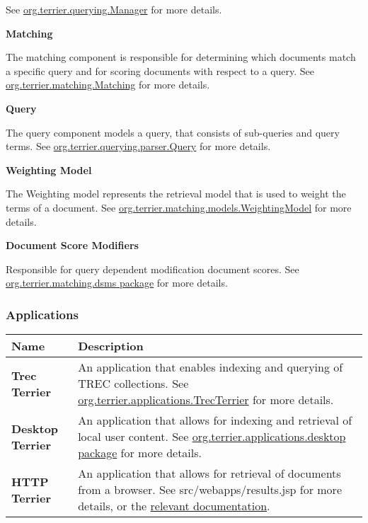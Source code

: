 See
\href{javadoc/org/terrier/querying/Manager.html}{org.terrier.querying.Manager}
for more details.

\textbf{Matching}

The matching component is responsible for determining which documents
match a specific query and for scoring documents with respect to a
query. See
\href{javadoc/org/terrier/matching/Matching.html}{org.terrier.matching.Matching}
for more details.

\textbf{Query}

The query component models a query, that consists of sub-queries and
query terms. See
\href{javadoc/org/terrier/querying/parser/Query.html}{org.terrier.querying.parser.Query}
for more details.

\textbf{Weighting Model}

The Weighting model represents the retrieval model that is used to
weight the terms of a document. See
\href{javadoc/org/terrier/matching/models/WeightingModel.html}{org.terrier.matching.models.WeightingModel}
for more details.

\textbf{Document Score Modifiers}

Responsible for query dependent modification document scores. See
\href{javadoc/org/terrier/matching/dsms/package-summary.html}{org.terrier.matching.dsms
package} for more details.

\subsubsection{Applications}\label{applications}

\begin{longtable}[]{@{}ll@{}}
\toprule
\textbf{Name} & \textbf{Description}\tabularnewline
\midrule
\endhead
\textbf{Trec Terrier} & An application that enables indexing and
querying of TREC collections. See
\href{javadoc/org/terrier/applications/TrecTerrier.html}{org.terrier.applications.TrecTerrier}
for more details.\tabularnewline
\textbf{Desktop Terrier} & An application that allows for indexing and
retrieval of local user content. See
\href{javadoc/org/terrier/applications/desktop/package-summary.html}{org.terrier.applications.desktop
package} for more details.\tabularnewline
\textbf{HTTP Terrier} & An application that allows for retrieval of
documents from a browser. See src/webapps/results.jsp for more details,
or the \href{terrier_http.html}{relevant documentation}.\tabularnewline
\bottomrule
\end{longtable}

